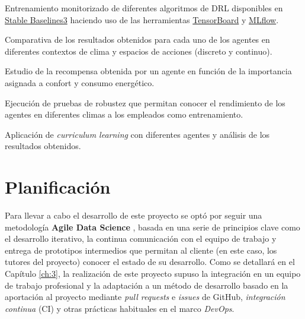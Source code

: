 \begin{tcolorbox}[colbacktitle=orange!30!white, title=Subobjetivo 3, coltitle=black, fonttitle=\bfseries]
Entrenamiento monitorizado de diferentes algoritmos de DRL disponibles en \href{https://github.com/DLR-RM/stable-baselines3}{Stable Baselines3} haciendo uso de las herramientas \href{https://tensorflow.org/tensorboard}{TensorBoard} y \href{https://mlflow.org/}{MLflow}.
\end{tcolorbox}

\begin{tcolorbox}[colbacktitle=orange!30!white, title=Subobjetivo 4, coltitle=black, fonttitle=\bfseries]
Comparativa de los resultados obtenidos para cada uno de los agentes en diferentes contextos de clima y espacios de acciones (discreto y continuo).
\end{tcolorbox}

\begin{tcolorbox}[colbacktitle=orange!30!white, title=Subobjetivo 5, coltitle=black, fonttitle=\bfseries]
Estudio de la recompensa obtenida por un agente en función de la importancia asignada a confort y consumo energético.
\end{tcolorbox}

\begin{tcolorbox}[colbacktitle=orange!30!white, title=Subobjetivo 5, coltitle=black, fonttitle=\bfseries]
Ejecución de pruebas de robustez que permitan conocer el rendimiento de los agentes en diferentes climas a los empleados como entrenamiento.
\end{tcolorbox}

\begin{tcolorbox}[colbacktitle=orange!30!white, title=Subobjetivo 5, coltitle=black, fonttitle=\bfseries]
Aplicación de \textit{curriculum learning} con diferentes agentes y análisis de los resultados obtenidos.
\end{tcolorbox}

\section{Planificación}

Para llevar a cabo el desarrollo de este proyecto se optó por seguir una metodología \textbf{Agile Data Science} \cite{jurney2017agile}, basada en una serie de principios clave como el desarrollo iterativo, la continua comunicación con el equipo de trabajo y entrega de prototipos intermedios que permitan al cliente (en este caso, los tutores del proyecto) conocer el estado de su desarrollo. Como se detallará en el Capítulo \ref{ch:3}, la realización de este proyecto supuso la integración en un equipo de trabajo profesional y la adaptación a un método de desarrollo basado en la aportación al proyecto mediante \textit{pull requests} e \textit{issues} de GitHub, \textit{integración continua} (CI) y otras prácticas habituales en el marco \textit{DevOps}.

